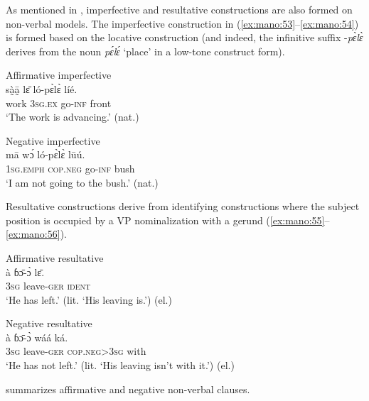 \documentclass[output=paper,colorlinks,citecolor=brown]{langscibook}
\begin{document}
As mentioned in , imperfective and resultative constructions are also formed on non-verbal models. The imperfective construction in (\ref{ex:mano:53}--\ref{ex:mano:54}) is formed based on the locative construction (and indeed, the infinitive suffix -\textit{pɛ̀lɛ̀} derives from the noun \textit{pɛ́lɛ́} ‘place’ in a low-tone construct form).

\ea\label{ex:mano:53}Affirmative imperfective\\
    \gll sà̰ā̰ lɛ̄ ló-pɛ̀lɛ̀ líé. \\
         work 3\textsc{sg.ex} go-\textsc{inf} front    \\
    \glt ‘The work is advancing.’ (nat.)
\z

\ea\label{ex:mano:54}Negative imperfective\\
    \gll mā wɔ́ ló-pɛ̀lɛ̀ lūú. \\
         \textsc{1sg.emph} \textsc{cop.neg} go-\textsc{inf} bush    \\
    \glt ‘I am not going to the bush.’ (nat.)
\z

Resultative constructions derive from identifying constructions where the subject position is occupied by a VP nominalization with a gerund (\ref{ex:mano:55}--\ref{ex:mano:56}).

\ea\label{ex:mano:55}Affirmative resultative\\
    \gll  à ɓɔ̄-ɔ̀ lɛ̄. \\
          3\textsc{sg} leave-\textsc{ger} \textsc{ident}    \\
    \glt ‘He has left.’ (lit. ‘His leaving is.’) (el.)
\z

\ea\label{ex:mano:56}Negative resultative\\
    \gll à ɓɔ̄-ɔ̀ wáá ká. \\
         \textsc{3sg} leave-\textsc{ger} \textsc{cop.neg>3sg} with    \\
    \glt ‘He has not left.’ (lit. ‘His leaving isn’t with it.’) (el.)
\z

 summarizes affirmative and negative non-verbal clauses.
\end{document}
